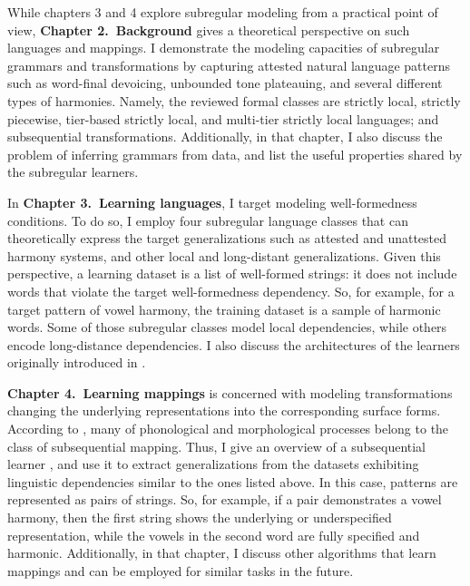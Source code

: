 While chapters 3 and 4 explore subregular modeling from a practical point of view, \textbf{Chapter 2.\ Background} gives a theoretical perspective on such languages and mappings.
I demonstrate the modeling capacities of subregular grammars and transformations by capturing attested natural language patterns such as word-final devoicing, unbounded tone plateauing, and several different types of harmonies.
Namely, the reviewed formal classes are strictly local, strictly piecewise, tier-based strictly local, and multi-tier strictly local languages; and subsequential transformations.
Additionally, in that chapter, I also discuss the problem of inferring grammars from data, and list the useful properties shared by the subregular learners.



In \textbf{Chapter 3.\ Learning languages}, I target modeling well-formedness conditions.
To do so, I employ four subregular language classes that can theoretically express the target generalizations such as attested and unattested harmony systems, and other local and long-distant generalizations.
Given this perspective, a learning dataset is a list of well-formed strings: it does not include words that violate the target well-formedness dependency.
So, for example, for a target pattern of vowel harmony, the training dataset is a sample of harmonic words.
Some of those subregular classes model local dependencies, while others encode long-distance dependencies.
I also discuss the architectures of the learners originally introduced in \citep{Heinz-2010-SEL,JardineMcMullin2017,McMullinAksenovaDeSanto2019}.



\textbf{Chapter 4.\ Learning mappings} is concerned with modeling transformations changing the underlying representations into the corresponding surface forms.
According to \cite{Chandlee2014}, many of phonological and morphological processes belong to the class of subsequential mapping.
Thus, I give an overview of a subsequential learner \citep{OncinaEtAl1993,DeLaHiguera2010}, and use it to extract generalizations from the datasets exhibiting linguistic dependencies similar to the ones listed above.
In this case, patterns are represented as pairs of strings.
So, for example, if a pair demonstrates a vowel harmony, then the first string shows the underlying or underspecified representation, while the vowels in the second word are fully specified and harmonic.
Additionally, in that chapter, I discuss other algorithms that learn mappings and can be employed for similar tasks in the future.



